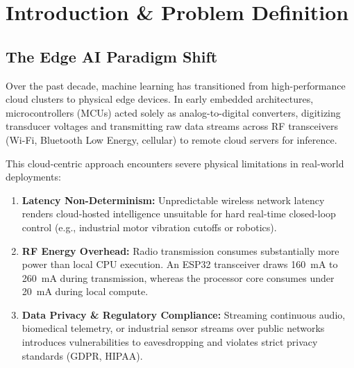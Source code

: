 \documentclass[12pt,a4paper]{report}
\begin{document}
\newpage

\tableofcontents
\newpage
\listoffigures
\newpage
\listoftables
\newpage

\setcounter{page}{1}

\chapter{Introduction \& Problem Definition}

\section{The Edge AI Paradigm Shift}
Over the past decade, machine learning has transitioned from high-performance cloud clusters to physical edge devices. In early embedded architectures, microcontrollers (MCUs) acted solely as analog-to-digital converters, digitizing transducer voltages and transmitting raw data streams across RF transceivers (Wi-Fi, Bluetooth Low Energy, cellular) to remote cloud servers for inference.

This cloud-centric approach encounters severe physical limitations in real-world deployments:
\begin{enumerate}
    \item \textbf{Latency Non-Determinism:} Unpredictable wireless network latency renders cloud-hosted intelligence unsuitable for hard real-time closed-loop control (e.g., industrial motor vibration cutoffs or robotics).
    \item \textbf{RF Energy Overhead:} Radio transmission consumes substantially more power than local CPU execution. An ESP32 transceiver draws 160~mA to 260~mA during transmission, whereas the processor core consumes under 20~mA during local compute.
    \item \textbf{Data Privacy \& Regulatory Compliance:} Streaming continuous audio, biomedical telemetry, or industrial sensor streams over public networks introduces vulnerabilities to eavesdropping and violates strict privacy standards (GDPR, HIPAA).
\end{enumerate}
\end{document}
